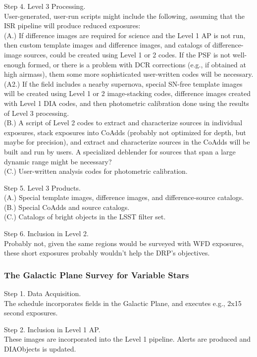 \documentclass[DM,lsstdraft,toc]{lsstdoc}
\begin{document}
Step 4. Level 3 Processing. \\ User-generated, user-run scripts might include the following, assuming that the ISR pipeline will produce reduced exposures: \\
(A.) If difference images are required for science and the Level 1 AP is not run, then custom template images and difference images, and catalogs of difference-image sources, could be created using Level 1 or 2 codes. If the PSF is not well-enough formed, or there is a problem with DCR corrections (e.g., if obtained at high airmass), them some more sophisticated user-written codes will be necessary. \\
(A2.) If the field includes a nearby supernova, special SN-free template images will be created using Level 1 or 2 image-stacking codes, difference images created with Level 1 DIA codes, and then photometric calibration done using the results of Level 3 processing.\\
(B.) A script of Level 2 codes to extract and characterize sources in individual exposures, stack exposures into CoAdds (probably not optimized for depth, but maybe for precision), and extract and characterize sources in the CoAdds will be built and run by users. A specialized deblender for sources that span a large dynamic range might be necessary? \\
(C.) User-written analysis codes for photometric calibration. 

Step 5. Level 3 Products. \\ 
(A.) Special template images, difference images, and difference-source catalogs. \\
(B.) Special CoAdds and source catalogs. \\
(C.) Catalogs of bright objects in the LSST filter set. 

Step 6. Inclusion in Level 2. \\ Probably not, given the same regions would be surveyed with WFD exposures, these short exposures probably wouldn't help the DRP's objectives. 


\subsubsection{The Galactic Plane Survey for Variable Stars}

Step 1. Data Acquisition. \\ The schedule incorporates fields in the Galactic Plane, and executes e.g., 2x15 second exposures.

Step 2. Inclusion in Level 1 AP. \\ These images are incorporated into the Level 1 pipeline. Alerts are produced and DIAObjects is updated.
\end{document}
